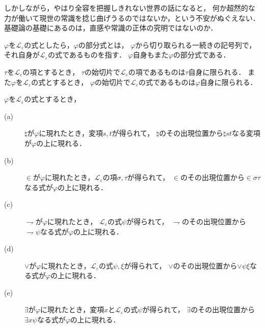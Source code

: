 	しかしながら，やはり全容を把握しきれない世界の話になると，
	何か超然的な力が働いて現世の常識を捻じ曲げうるのではないか，という不安がぬぐえない．
	基礎論の基礎にあるのは，直感や常識の正体の究明ではないのか．
	
	$\varphi$を$\mathcal{L}_{\varepsilon}$の式としたら，$\varphi$の部分式とは，
	$\varphi$から切り取られる一続きの記号列で，それ自身が$\mathcal{L}_{\varepsilon}$の式であるものを指す．
	$\varphi$自身もまた$\varphi$の部分式である．
	
	\begin{screen}
		\begin{metathm}\label{metathm:initial_segment_L_epsilon}
			$\tau$を$\mathcal{L}_{\varepsilon}$の項とするとき，
			$\tau$の始切片で$\mathcal{L}_{\varepsilon}$の項であるものは$\tau$自身に限られる．
			また$\varphi$を$\mathcal{L}_{\varepsilon}$の式とするとき，
			$\varphi$の始切片で$\mathcal{L}_{\varepsilon}$の式であるものは$\varphi$自身に限られる．
		\end{metathm}
	\end{screen}
	
	\begin{screen}
		\begin{metathm}
			$\varphi$を$\mathcal{L}_{\varepsilon}$の式とするとき，
			\begin{description}
				\item[(a)] $\natural$が$\varphi$に現れたとき，変項$s,t$が得られて，
					$\natural$のその出現位置から$\natural s t$なる変項が$\varphi$の上に現れる．
					
				\item[(b)] $\in$が$\varphi$に現れたとき，$\mathcal{L}_{\varepsilon}$の項$\sigma,\tau$が得られて，
					$\in$のその出現位置から$\in \sigma \tau$なる式が$\varphi$の上に現れる．
				
				\item[(c)] $\rightharpoondown$が$\varphi$に現れたとき，
					$\mathcal{L}_{\varepsilon}$の式$\psi$が得られて，
					$\rightharpoondown$のその出現位置から
					$\rightharpoondown \psi$なる式が$\varphi$の上に現れる．
				
				\item[(d)] $\vee$が$\varphi$に現れたとき，$\mathcal{L}_{\varepsilon}$の式$\psi,\xi$が得られて，
					$\vee$のその出現位置から$\vee \psi \xi$なる式が$\varphi$の上に現れる．
				
				\item[(e)] $\exists$が$\varphi$に現れたとき，変項$x$と$\mathcal{L}_{\varepsilon}$の式$\psi$が得られて，
					$\exists$のその出現位置から$\exists x \psi$なる式が$\varphi$の上に現れる．
			\end{description}
		\end{metathm}
	\end{screen}
	

